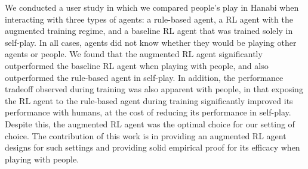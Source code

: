 \documentclass[letterpaper]{article} %
\begin{document}
 We conducted a user study in which we compared people's play in Hanabi when interacting with three types of agents:  a rule-based agent, a RL agent with the augmented training regime, and a baseline RL agent that was 
trained solely in self-play. In all cases, agents did not know whether they would be playing other agents or people. 
We found that the augmented RL agent  significantly  outperformed  the baseline RL agent when playing with people, and also outperformed the  rule-based agent in self-play.
In addition, the performance tradeoff observed during training was also apparent with people, in that   exposing the RL agent to the rule-based agent during training significantly  improved its performance with humans, at the cost of reducing its performance in self-play. Despite this,  the augmented RL agent was the optimal choice  for our setting of choice.
The  contribution of this work is in providing an augmented RL agent designs for such settings and providing solid empirical proof for its efficacy when playing with people.


\end{document}
